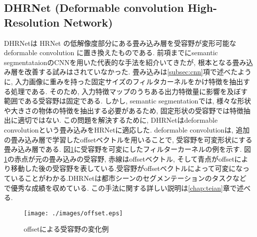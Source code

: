 \subsection{DHRNet (Deformable convolution High-Resolution Network)}\label{subsec:dhrnet}
DHRNet\cite{dhrnet}は HRNet の低解像度部分にある畳み込み層を受容野が変形可能な deformable convolution に置き換えたものである. 
前項までにsemantic segmentataionのCNNを用いた代表的な手法を紹介いてきたが, 根本となる畳み込み層を改善する試みはされていなかった. 畳み込みは\ref{subsec:cnn}項で述べたように, 入力画像に重みを持った固定サイズのフィルタカーネルをかけ特徴を抽出する処理である. そのため, 入力特徴マップのうちある出力特徴量に影響を及ぼす範囲である受容野は固定である. 
しかし, semantic segmentationでは, 様々な形状や大きさの物体の特徴を抽出する必要があるため, 固定形状の受容野では特徴抽出に適切ではない. この問題を解決するために, DHRNetはdeformable convolutionという畳み込みをHRNetに適応した\cite{dhrnet}. deformable convolutionは, 追加の畳み込み層で学習したoffsetベクトルを用いることで, 受容野を可変形状にする畳み込み層である.  図\ref{fig:offset}に受容野を可変にしたフィルターカーネルの例を示す. 図\ref{fig:offset}の赤点が元の畳み込みの受容野, 赤線はoffsetベクトル, そして青点がoffsetにより移動した後の受容野を表している.受容野がoffsetベクトルによって可変になっていることがわかる.DHRNetは都市シーンのセグメンテーションのタスクなどで優秀な成績を収めている. 
この手法に関する詳しい説明は\ref{chap:teian}章で述べる.

\begin{figure}[H]
    \centering
    \texttt{[image: ./images/offset.eps]}
    \caption{offsetによる受容野の変化例}
    \label{fig:offset}
\end{figure}

